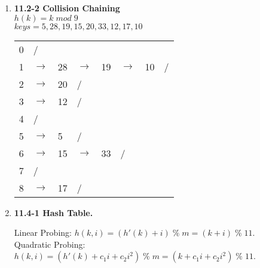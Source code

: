 \documentclass{article}
\begin{document}
\begin{enumerate}
    \item \textbf{11.2-2 Collision Chaining} \\
    
    $h(k) = k\;mod\;9$ \\
    $keys = 5, 28, 19, 15, 20, 33, 12, 17, 10$ \\

    \begin{table}[H]
      \begin{tabular}{l|l|llllll}
      \cline{2-2}
      0 & / & & & & & &  \\ \cline{2-8} 
      1 & $\rightarrow$ & \multicolumn{1}{l|}{28} & \multicolumn{1}{l|}{$\rightarrow$} & \multicolumn{1}{l|}{19} & \multicolumn{1}{l|}{$\rightarrow$} & \multicolumn{1}{l|}{10} & \multicolumn{1}{l|}{/} \\ \cline{2-8} 
      2 & $\rightarrow$ & \multicolumn{1}{l|}{20} & \multicolumn{1}{l|}{/}& & & &  \\ \cline{2-4}
      3 & $\rightarrow$ & \multicolumn{1}{l|}{12} & \multicolumn{1}{l|}{/}& & & &  \\ \cline{2-4}
      4 & / & & & & & &  \\ \cline{2-4}
      5 & $\rightarrow$ & \multicolumn{1}{l|}{5}  & \multicolumn{1}{l|}{/}& & & &  \\ \cline{2-6}
      6 & $\rightarrow$ & \multicolumn{1}{l|}{15} & \multicolumn{1}{l|}{$\rightarrow$} & \multicolumn{1}{l|}{33} & \multicolumn{1}{l|}{/}& &  \\ \cline{2-6}
      7 & / & & & & & &  \\ \cline{2-4}
      8 & $\rightarrow$ & \multicolumn{1}{l|}{17} & \multicolumn{1}{l|}{/}& & & &  \\ \cline{2-4}
      \end{tabular}
      \end{table}
    
    \item \textbf{11.4-1 Hash Table.}

    Linear Probing: $h(k,i) = (h'(k) + i)\;\%\;m = (k + i)\;\%\;11$. \\
    Quadratic Probing: $h(k,i) = (h'(k) + c_1i + c_2i^2)\;\%\;m = (k + c_1i + c_2i^2)\;\%\;11$. \\
    

\end{enumerate}
\end{document}
